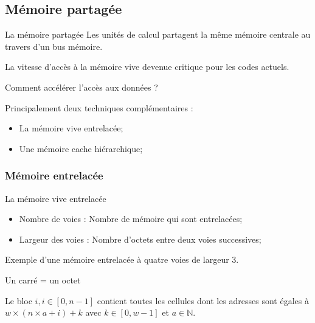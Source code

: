 \documentclass[handout]{beamer}
\begin{document}
\subsection{Mémoire partagée}

\begin{frame}[fragile]{La mémoire partagée}
 Les unités de calcul partagent la même mémoire centrale au travers d'un bus mémoire.

 La vitesse d'accès à la mémoire vive devenue critique pour les codes actuels.
 
 Comment accélérer l'accès aux données ?
 
 Principalement deux techniques complémentaires :
 \begin{itemize}
  \item La mémoire vive entrelacée;
  \item Une mémoire cache hiérarchique;
 \end{itemize}
\end{frame}

\subsubsection{Mémoire entrelacée}

\begin{frame}[fragile]{La mémoire vive entrelacée}

\begin{itemize}
 \item Nombre de voies : Nombre de mémoire qui sont entrelacées;
 \item Largeur des voies : Nombre d'octets entre deux voies successives;
\end{itemize}

\begin{center}
 Exemple d'une mémoire entrelacée à quatre voies de largeur 3.
 
 
 Un carré = un octet
\end{center}

Le bloc $i, i\in \left[0, n-1\right]$ contient toutes les cellules dont les adresses sont égales à 
  $w\times ( n \times a + i ) +  k $ avec $k\in \left[0,w-1\right]$ et $a\in \mathds{N}$. 

\end{frame}
\end{document}
